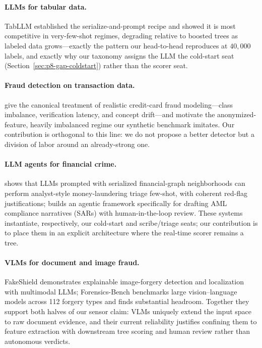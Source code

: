 \documentclass{article}
\providecommand{\secref}[1]{Section~\ref{#1}}
\begin{document}
\paragraph{LLMs for tabular data.} TabLLM \citep{hegselmann2023tabllm}
established the serialize-and-prompt recipe and showed it is most competitive
in very-few-shot regimes, degrading relative to boosted trees as labeled data
grows---exactly the pattern our head-to-head reproduces at $40{,}000$ labels,
and exactly why our taxonomy assigns the LLM the cold-start seat
(\secref{sec:p8-gap-coldstart}) rather than the scorer seat.

\paragraph{Fraud detection on transaction data.} \citet{dalpozzolo2018realistic}
give the canonical treatment of realistic credit-card fraud modeling---class
imbalance, verification latency, and concept drift---and motivate the
anonymized-feature, heavily imbalanced regime our synthetic benchmark
imitates. Our contribution is orthogonal to this line: we do not propose a
better detector but a division of labor around an already-strong one.

\paragraph{LLM agents for financial crime.} \citet{pirmorad2025icl_aml} shows
that LLMs prompted with serialized financial-graph neighborhoods can perform
analyst-style money-laundering triage few-shot, with coherent red-flag
justifications; \citet{naik2025coinvestigator} builds an agentic framework
specifically for drafting AML compliance narratives (SARs) with
human-in-the-loop review. These systems instantiate, respectively, our
cold-start and scribe/triage seats; our contribution is to place them in an
explicit architecture where the real-time scorer remains a tree.

\paragraph{VLMs for document and image fraud.} FakeShield
\citep{xu2024fakeshield} demonstrates explainable image-forgery detection and
localization with multimodal LLMs; Forensics-Bench \citep{wang2025forensicsbench}
benchmarks large vision--language models across 112 forgery types and finds
substantial headroom. Together they support both halves of our sensor claim:
VLMs uniquely extend the input space to raw document evidence, and their
current reliability justifies confining them to feature extraction with
downstream tree scoring and human review rather than autonomous verdicts.
\end{document}
